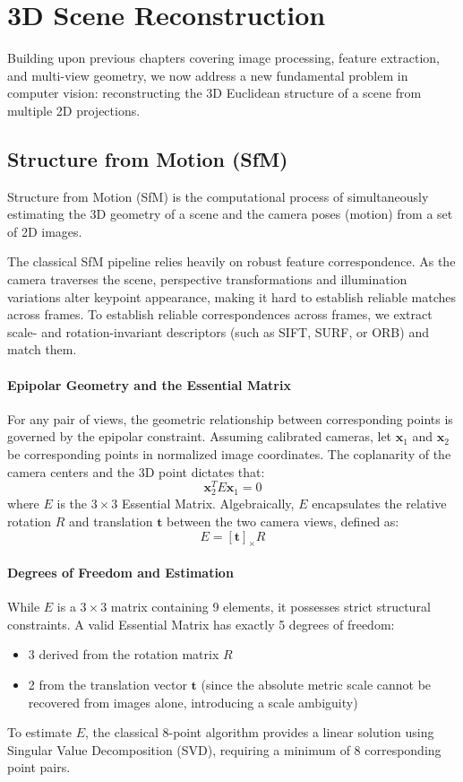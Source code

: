 \section{3D Scene Reconstruction}
Building upon previous chapters covering image processing, feature extraction, and multi-view geometry, we now address a new fundamental problem in computer vision:
reconstructing the 3D Euclidean structure of a scene from multiple 2D projections.

\subsection{Structure from Motion (SfM)}
Structure from Motion (SfM) is the computational process of simultaneously estimating the 3D geometry of a scene and the 
camera poses (motion) from a set of 2D images. 

The classical SfM pipeline relies heavily on robust feature correspondence. 
As the camera traverses the scene, perspective transformations and illumination variations alter keypoint appearance, making it hard to establish reliable matches across frames.
To establish reliable correspondences across frames, we extract scale- and rotation-invariant descriptors (such as SIFT, SURF, or ORB) and match them.

\paragraph{Epipolar Geometry and the Essential Matrix}
For any pair of views, the geometric relationship between corresponding points is governed by the epipolar constraint.
Assuming calibrated cameras, let $\mathbf{x}_1$ and $\mathbf{x}_2$ be corresponding points in normalized image coordinates. 
The coplanarity of the camera centers and the 3D point dictates that:
\[
    \mathbf{x}_2^T E \mathbf{x}_1 = 0
\]
where $E$ is the $3 \times 3$ Essential Matrix. 
Algebraically, $E$ encapsulates the relative rotation $R$ and translation $\mathbf{t}$ between the two camera views, defined as:
\[
    E = [\mathbf{t}]_{\times} R
\]

\paragraph{Degrees of Freedom and Estimation}
While $E$ is a $3 \times 3$ matrix containing 9 elements, it possesses strict structural constraints. 
A valid Essential Matrix has exactly 5 degrees of freedom: 
\begin{itemize}
    \item 3 derived from the rotation matrix $R$ 
    \item 2 from the translation vector $\mathbf{t}$ (since the absolute metric scale cannot be recovered from images alone, introducing a scale ambiguity)
\end{itemize}
To estimate $E$, the classical 8-point algorithm provides a linear solution using Singular Value Decomposition (SVD), requiring a minimum of 8 corresponding point pairs. 

